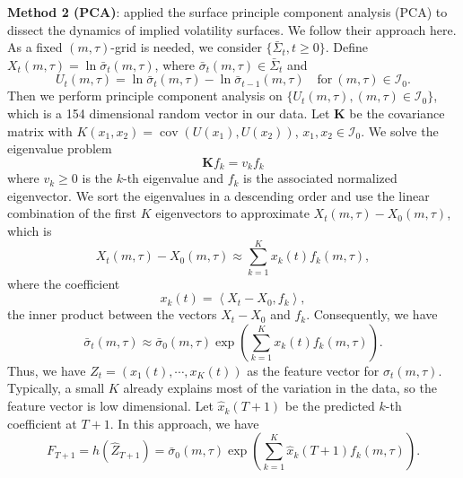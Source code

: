 \documentclass[11pt,a4paper]{article}
\theoremstyle{remark}
\begin{document}
\smallskip
\noindent \textbf{Method 2 (PCA)}: \cite{cont2002dynamics} applied the surface principle component analysis (PCA) to dissect the dynamics of implied volatility surfaces. We follow their approach here. As a fixed $(m,\tau)$-grid is needed, we consider $\{\bar{\Sigma}_t, t\ge 0\}$. Define 
$X_{t}(m, \tau)=\ln \bar{\sigma}_{t}(m, \tau)$, where $\bar{\sigma}_{t}(m, \tau)\in \bar{\Sigma}_t$ and 
\begin{equation}
	U_{t}(m, \tau)=\ln \bar{\sigma}_{t}(m, \tau)-\ln \bar{\sigma}_{t-1}(m, \tau)\quad \text{for}\ (m,\tau)\in\mathcal{I}_0.
\end{equation}
Then we perform principle component analysis on $\{U_{t}(m, \tau), (m,\tau)\in\mathcal{I}_0\}$, which is a 154 dimensional random vector in our data. Let $\textbf{K}$ be the covariance matrix with $K\left(x_{1}, x_{2}\right)=\operatorname{cov}\left(U\left(x_{1}\right), U\left(x_{2}\right)\right)$, $x_{1}, x_{2} \in \mathcal{I}_{0}$. We solve the eigenvalue problem
\begin{equation}
	\textbf{K}f_{k} = v_{k} f_{k}
\end{equation}
where $v_k\ge 0$ is the $k$-th eigenvalue and $f_k$ is the associated normalized eigenvector. We sort the eigenvalues in a descending order and use the linear combination of the first $K$ eigenvectors to approximate $X_t(m, \tau)-X_0(m, \tau)$, which is 
\begin{equation}\label{pca-x}
	X_t(m,\tau)-X_0(m, \tau)\approx \sum_{k=1}^K x_k(t) f_k(m,\tau),
\end{equation}
where the coefficient
\begin{equation}
	x_k(t)=\left\langle X_{t}-X_0, f_{k}\right\rangle,
\end{equation}
the inner product between the vectors $X_{t}-X_0$ and $f_{k}$. Consequently, we have
\begin{equation}
\bar{\sigma}_{t}(m, \tau)\approx\bar{\sigma}_{0}(m, \tau) \exp \left(\sum_{k=1}^K x_{k}(t) f_{k}(m, \tau)\right).
\end{equation}
Thus, we have $Z_t=(x_1(t),\cdots,x_K(t))$ as the feature vector for $\sigma_t(m,\tau)$. Typically, a small $K$ already explains most of the variation in the data, so the feature vector is low dimensional. Let $\hat{x}_k(T+1)$ be the predicted $k$-th coefficient at $T+1$. In this approach, we have
\begin{equation}\label{F-PCA}
F_{T+1}=h(\hat{Z}_{T+1})=\bar{\sigma}_{0}(m, \tau) \exp \left(\sum_{k=1}^K \hat{x}_{k}(T+1) f_{k}(m, \tau)\right).
\end{equation}
\end{document}
